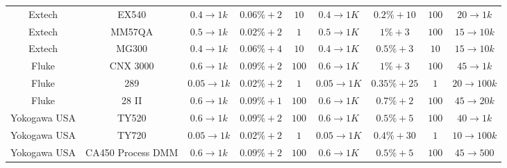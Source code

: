 \begin{table}
\begin{tabular}{cc|ccc|cccc}
        Extech& EX540& $0.4\to1k$& $0.06\%+2$& $10$& $0.4\to1K$& $0.2\%+10$& $100$& $20\to1k$\\
        Extech& MM57QA& $0.5\to1k$& $0.02\%+2$& $1$& $0.5\to1K$& $1\%+3$& $100$& $15\to10k$\\
        Extech& MG300& $0.4\to1k$& $0.06\%+4$& $10$& $0.4\to1K$& $0.5\%+3$& $10$& $15\to10k$\\\hline
        Fluke& CNX 3000& $0.6\to1k$& $0.09\%+2$& $100$& $0.6\to1K$& $1\%+3$& $100$& $45\to1k$\\
        Fluke& 289& $0.05\to1k$& $0.02\%+2$& $1$& $0.05\to1K$& $0.35\%+25$& $1$& $20\to100k$\\
        Fluke& 28 II& $0.6\to1k$& $0.09\%+1$& $100$& $0.6\to1K$& $0.7\%+2$& $100$& $45\to20k$\\\hline
        Yokogawa USA& TY520& $0.6\to1k$& $0.09\%+2$& $100$& $0.6\to1K$& $0.5\%+5$& $100$& $40\to1k$\\
        Yokogawa USA& TY720& $0.05\to1k$& $0.02\%+2$& $1$& $0.05\to1K$& $0.4\%+30$& $1$& $10\to100k$\\
        Yokogawa USA& CA450 Process DMM& $0.6\to1k$& $0.09\%+2$& $100$& $0.6\to1K$& $0.5\%+5$& $100$& $45\to500$\\\hline
    \end{tabular}
\end{table}
